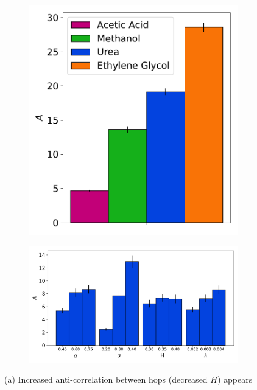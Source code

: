 \documentclass[aps,pre,preprint,groupedaddress,longbibliography]{revtex4-2}
\begin{document}
\begin{figure}
\begin{subfigure}{0.31\textwidth}
  \includegraphics[width=\textwidth]{c_parameter_comparison.pdf}
  \caption{}\label{fig:c_parameters}
  \end{subfigure}
  \begin{subfigure}{0.66\textwidth}
  \includegraphics[width=\textwidth]{c_influence.pdf}
  \caption{}\label{fig:c_influence}
  \end{subfigure}
  \vspace{-.5cm}
  \caption{(a) Increased anti-correlation between hops (decreased $H$) appears
}
\end{figure}
\end{document}
